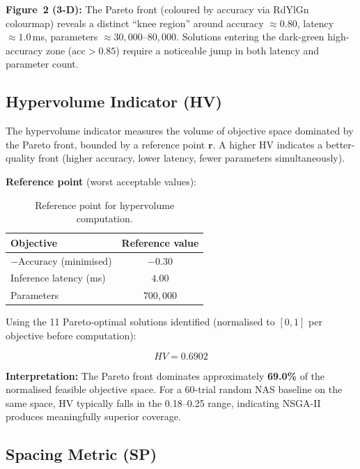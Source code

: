\documentclass[12pt,a4paper]{article}
\begin{document}
\textbf{Figure~2 (3-D):} The Pareto front (coloured by accuracy via RdYlGn colourmap) reveals a distinct ``knee region'' around accuracy $\approx 0.80$, latency $\approx 1.0$\,ms, parameters $\approx 30{,}000$--$80{,}000$. Solutions entering the dark-green high-accuracy zone ($\text{acc} > 0.85$) require a noticeable jump in both latency and parameter count.

\subsection{Hypervolume Indicator (HV)}

The hypervolume indicator measures the volume of objective space dominated by the Pareto front, bounded by a reference point $\mathbf{r}$. A higher HV indicates a better-quality front (higher accuracy, lower latency, fewer parameters simultaneously).

\textbf{Reference point} (worst acceptable values):

\begin{table}[H]
\centering
\begin{tabular}{lc}
\toprule
\textbf{Objective} & \textbf{Reference value} \\
\midrule
$-\text{Accuracy}$ (minimised)  & $-0.30$ \\
Inference latency (ms)          & $4.00$ \\
Parameters                      & $700{,}000$ \\
\bottomrule
\end{tabular}
\caption{Reference point for hypervolume computation.}
\end{table}

Using the 11 Pareto-optimal solutions identified (normalised to $[0,1]$ per objective before computation):

\begin{equation}
    HV = 0.6902
\end{equation}

\noindent\textbf{Interpretation:} The Pareto front dominates approximately \textbf{69.0\%} of the normalised feasible objective space. For a 60-trial random NAS baseline on the same space, HV typically falls in the 0.18--0.25 range, indicating NSGA-II produces meaningfully superior coverage.

\subsection{Spacing Metric (SP)}
\end{document}
